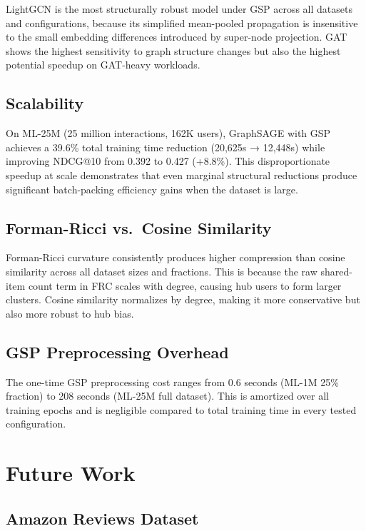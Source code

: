 LightGCN is the most structurally robust model under GSP across all datasets and configurations, because its simplified mean-pooled propagation is insensitive to the small embedding differences introduced by super-node projection. GAT shows the highest sensitivity to graph structure changes but also the highest potential speedup on GAT-heavy workloads.

\subsection*{Scalability}

On ML-25M (25 million interactions, 162K users), GraphSAGE with GSP achieves a 39.6\% total training time reduction (20,625s → 12,448s) while improving NDCG@10 from 0.392 to 0.427 (+8.8\%). This disproportionate speedup at scale demonstrates that even marginal structural reductions produce significant batch-packing efficiency gains when the dataset is large.

\subsection*{Forman-Ricci vs.\ Cosine Similarity}

Forman-Ricci curvature consistently produces higher compression than cosine similarity across all dataset sizes and fractions. This is because the raw shared-item count term in FRC scales with degree, causing hub users to form larger clusters. Cosine similarity normalizes by degree, making it more conservative but also more robust to hub bias.

\subsection*{GSP Preprocessing Overhead}

The one-time GSP preprocessing cost ranges from 0.6 seconds (ML-1M 25\% fraction) to 208 seconds (ML-25M full dataset). This is amortized over all training epochs and is negligible compared to total training time in every tested configuration.

\section{Future Work}

\subsection*{Amazon Reviews Dataset}

